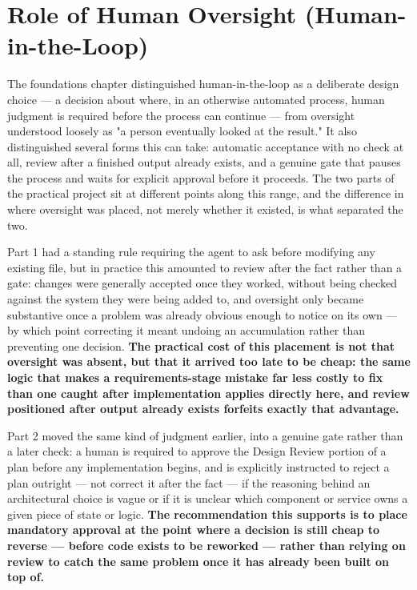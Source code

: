 \section{Role of Human Oversight (Human-in-the-Loop)}

The foundations chapter distinguished human-in-the-loop as a deliberate design choice --- a decision about where, in an otherwise automated process, human judgment is required before the process can continue --- from oversight understood loosely as "a person eventually looked at the result." It also distinguished several forms this can take: automatic acceptance with no check at all, review after a finished output already exists, and a genuine gate that pauses the process and waits for explicit approval before it proceeds. The two parts of the practical project sit at different points along this range, and the difference in where oversight was placed, not merely whether it existed, is what separated the two.

Part 1 had a standing rule requiring the agent to ask before modifying any existing file, but in practice this amounted to review after the fact rather than a gate: changes were generally accepted once they worked, without being checked against the system they were being added to, and oversight only became substantive once a problem was already obvious enough to notice on its own --- by which point correcting it meant undoing an accumulation rather than preventing one decision. \textbf{The practical cost of this placement is not that oversight was absent, but that it arrived too late to be cheap: the same logic that makes a requirements-stage mistake far less costly to fix than one caught after implementation applies directly here, and review positioned after output already exists forfeits exactly that advantage.}

Part 2 moved the same kind of judgment earlier, into a genuine gate rather than a later check: a human is required to approve the Design Review portion of a plan before any implementation begins, and is explicitly instructed to reject a plan outright --- not correct it after the fact --- if the reasoning behind an architectural choice is vague or if it is unclear which component or service owns a given piece of state or logic. \textbf{The recommendation this supports is to place mandatory approval at the point where a decision is still cheap to reverse --- before code exists to be reworked --- rather than relying on review to catch the same problem once it has already been built on top of.}

